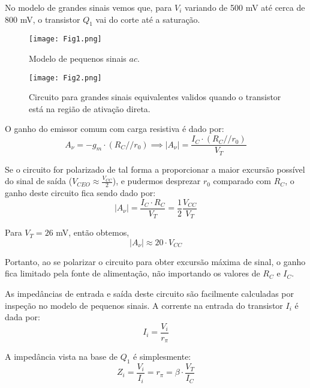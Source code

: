 \documentclass[letterpaper, 12pt]{article}
\begin{document}
No modelo de grandes sinais vemos que, para $V_{i}$ variando de 500 mV até cerca de 800 mV, o transistor $Q_{1}$ vai do corte até a saturação.

\begin{figure}[h]
    \centering
    \texttt{[image: Fig1.png]}
    \caption{Modelo de pequenos sinais $ac$.}
    \label{fig:Fig1}
\end{figure}

\begin{figure}[h]
    \centering
    \texttt{[image: Fig2.png]}
    \caption{Circuito para grandes sinais equivalentes validos quando o transistor está na região de ativação direta.}
    \label{fig:Fig2}
\end{figure}

O ganho do emissor comum com carga resistiva é dado por:
\begin{equation}
    A_{\nu}=-g_{m}\cdot(R_{C}//r_{0})\implies|A_{\nu}|=\frac{I_{C}\cdot(R_{C}//r_{0})}{V_{T}}
\end{equation}

Se o circuito for polarizado de tal forma a proporcionar a maior excursão possível do sinal de saída ($V_{CEO}\approx\frac{V_{CC}}{2}$), e pudermos desprezar $r_{0}$ comparado com $R_{C}$, o ganho deste circuito fica sendo dado por:
\begin{equation}
    |A_{\nu}|=\frac{I_{C}\cdot R_{C}}{V_{T}}=\frac{1}{2}\frac{V_{CC}}{V_{T}}
\end{equation}

Para $V_{T}=26$ mV, então obtemos,
\begin{equation}
    |A_{\nu}|\approx20\cdot V_{CC}
\end{equation}

Portanto, ao se polarizar o circuito para obter excursão máxima de sinal, o ganho fica limitado pela fonte de alimentação, não importando os valores de $R_{C}$ e $I_{C}$.

As impedâncias de entrada e saída deste circuito são facilmente calculadas por inspeção no modelo de pequenos sinais. A corrente na entrada do transistor $I_{i}$ é dada por:
\begin{equation}
    I_{i}=\frac{V_{i}}{r_{\pi}}
\end{equation}

A impedância vista na base de $Q_{1}$ é simplesmente:
\begin{equation}
    Z_{i}=\frac{V_{i}}{I_{i}}=r_{\pi}=\beta\cdot\frac{V_{T}}{I_{C}}
\end{equation}
\end{document}
